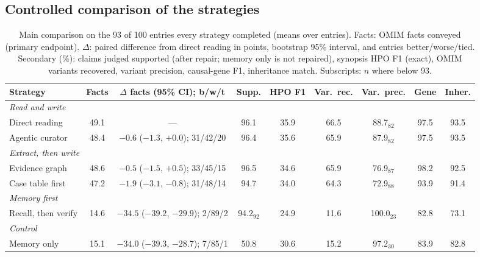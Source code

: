 \documentclass{article} %
\begin{document}
\subsection{Controlled comparison of the strategies}
\label{sec:main}
\begin{table}[t]
\caption{Main comparison on the 93 of 100 entries every strategy completed (means over entries). Facts: OMIM facts conveyed (primary endpoint). $\Delta$: paired difference from direct reading in points, bootstrap 95\% interval, and entries better/worse/tied. Secondary (\%): claims judged supported (after repair; memory only is not repaired), synopsis HPO F1 (exact), OMIM variants recovered, variant precision, causal-gene F1, inheritance match. Subscripts: $n$ where below 93.}
\label{tab:main}
\begin{center}
\footnotesize
\setlength{\tabcolsep}{2.2pt}
\begin{tabular}{lcccccccc}
\toprule
Strategy & Facts & $\Delta$ facts (95\% CI); b/w/t & Supp. & HPO F1 & Var.\ rec. & Var.\ prec. & Gene & Inher. \\
\midrule
\multicolumn{9}{l}{\emph{Read and write}} \\
Direct reading & 49.1 & --- & 96.1 & 35.9 & 66.5 & 88.7$_{82}$ & 97.5 & 93.5 \\
Agentic curator & 48.4 & $-0.6$ ($-1.3$, $+0.0$); 31/42/20 & 96.4 & 35.6 & 65.9 & 87.9$_{82}$ & 97.5 & 93.5 \\
\multicolumn{9}{l}{\emph{Extract, then write}} \\
Evidence graph & 48.6 & $-0.5$ ($-1.5$, $+0.5$); 33/45/15 & 96.5 & 34.6 & 65.9 & 76.9$_{87}$ & 98.2 & 92.5 \\
Case table first & 47.2 & $-1.9$ ($-3.1$, $-0.8$); 31/48/14 & 94.7 & 34.0 & 64.3 & 72.9$_{88}$ & 93.9 & 91.4 \\
\multicolumn{9}{l}{\emph{Memory first}} \\
Recall, then verify & 14.6 & $-34.5$ ($-39.2$, $-29.9$); 2/89/2 & 94.2$_{92}$ & 24.9 & 11.6 & 100.0$_{23}$ & 82.8 & 73.1 \\
\multicolumn{9}{l}{\emph{Control}} \\
Memory only & 15.1 & $-34.0$ ($-39.3$, $-28.7$); 7/85/1 & 50.8 & 30.6 & 15.2 & 97.2$_{30}$ & 83.9 & 82.8 \\
\bottomrule
\end{tabular}
\end{center}
\end{table}
\end{document}
